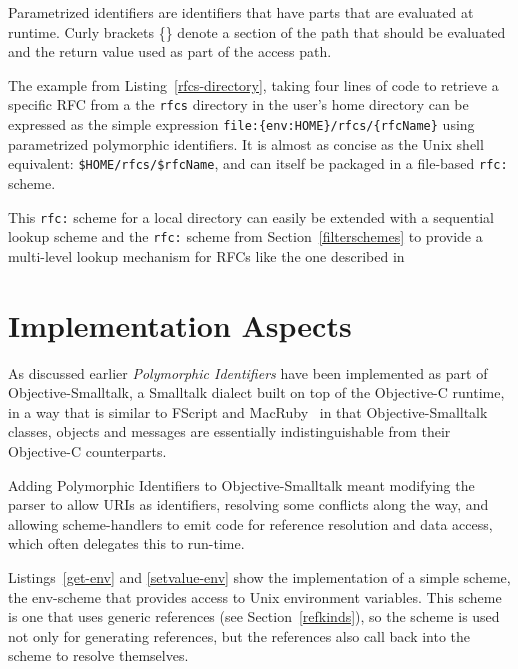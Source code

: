 \documentclass[preprint]{sigplanconf}
\begin{document}
Parametrized identifiers are identifiers that have parts that are evaluated
at runtime.  Curly brackets \{\} denote a section of the path that should be evaluated and
the return value used as part of the access path.

The example from Listing~\ref{rfcs-directory}, taking four lines of code to retrieve a specific RFC from a 
the {\tt rfcs} directory in the user's home directory can be expressed as the simple expression
{\tt file:\{env:HOME\}/rfcs/\{rfcName\}} using parametrized polymorphic identifiers.  It is almost
as concise as the Unix shell equivalent: {\tt \$HOME/rfcs/\$rfcName}, and can itself be packaged
in a file-based {\tt rfc:} scheme. 

This {\tt rfc:} scheme for a local directory can easily be extended with a sequential lookup scheme
and the {\tt rfc:} scheme from Section~\ref{filterschemes} to provide a multi-level lookup mechanism
for RFCs like the one described in 



\section{Implementation Aspects}
\label{implementation}

As discussed earlier \emph{Polymorphic Identifiers} have been implemented as part of Objective-Smalltalk,
a Smalltalk dialect built on top of the Objective-C\cite{objc-evol}\cite{objc-apple} runtime, 
in a way that is similar to FScript\cite{fscript} and MacRuby~\cite{macruby} in that Objective-Smalltalk classes,
objects and messages are essentially indistinguishable from their Objective-C counterparts.

Adding Polymorphic Identifiers to Objective-Smalltalk meant modifying the parser to allow URIs as identifiers,
resolving some conflicts along the way,
and allowing scheme-handlers to emit code for reference resolution and data access, which often
delegates this to run-time.



Listings~\ref{get-env} and \ref{setvalue-env} show the implementation of a simple scheme,
the env-scheme that provides access to Unix environment variables.  This scheme is
one that uses generic references (see Section~\ref{refkinds}), so the scheme is used
not only for generating references, but the references also call back into the scheme
to resolve themselves.
\end{document}
